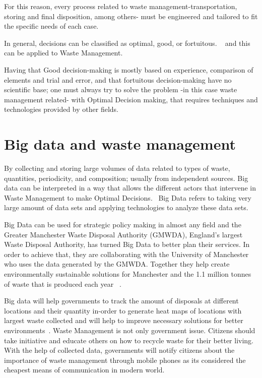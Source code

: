 \documentclass[sigconf]{acmart}
\begin{document}
For this reason, every process related to waste management-transportation, storing and final disposition, among others- must be engineered and tailored to fit the specific needs of each case.

In general, decisions can be classified as optimal, good, or fortuitous. ~\cite{akbarpour2016} and this can be applied to Waste Management.

Having that Good decision-making is mostly based on experience, comparison of elements and trial and error, and that fortuitous decision-making have no scientific base; one must always try to solve the problem -in this case waste management related- with Optimal Decision making, that requires techniques and technologies provided by other fields. 
 ~\cite{akbarpour2016}


\section{ Big data and waste management}
By collecting and storing large volumes of  data related to types of waste, quantities, periodicity, and composition; usually from independent sources. Big data can be interpreted in a way that allows the different actors that intervene in Waste Management to make Optimal Decisions.~\cite{yenkar2014review} Big Data refers to taking very large amount of data sets and applying technologies to analyze these data sets.

Big Data can be used for strategic policy making in almost any field and the Greater Manchester Waste Disposal Authority (GMWDA), England's largest Waste Disposal Authority, has turned Big Data to better plan their services. In order to achieve that, they are collaborating with the University of Manchester who uses the data generated by the GMWDA. Together they help create environmentally sustainable solutions for Manchester and the 1.1 million tonnes of waste that is produced each year ~\cite{markvan2016}. 

Big data will help governments to track the amount of disposals at different locations and their quantity in-order to generate heat maps of locations with largest waste collected and will help to improve necessary solutions for better environments~\cite{markvan2016}. Waste Management is not only government issue. Citizens should take initiative and educate others on how to recycle waste for their better living. With the help of collected data, governments will notify citizens about the importance of waste management through mobile phones as its considered the cheapest means of communication in modern world.
\end{document}
